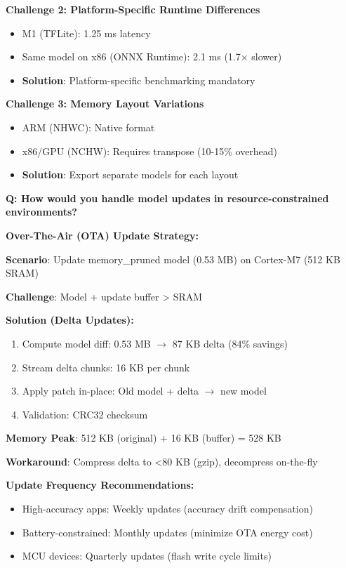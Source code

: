 \documentclass[10pt, a4paper]{article}
\begin{document}
\textbf{Challenge 2: Platform-Specific Runtime Differences}
\begin{itemize}
    \item M1 (TFLite): 1.25 ms latency
    \item Same model on x86 (ONNX Runtime): 2.1 ms (1.7× slower)
    \item \textbf{Solution}: Platform-specific benchmarking mandatory
\end{itemize}

\textbf{Challenge 3: Memory Layout Variations}
\begin{itemize}
    \item ARM (NHWC): Native format
    \item x86/GPU (NCHW): Requires transpose (10-15\% overhead)
    \item \textbf{Solution}: Export separate models for each layout
\end{itemize}

\textbf{Q: How would you handle model updates in resource-constrained environments?}

\textbf{Over-The-Air (OTA) Update Strategy:}

\textbf{Scenario}: Update memory\_pruned model (0.53 MB) on Cortex-M7 (512 KB SRAM)

\textbf{Challenge}: Model + update buffer > SRAM

\textbf{Solution (Delta Updates):}
\begin{enumerate}
    \item Compute model diff: 0.53 MB $\rightarrow$ 87 KB delta (84\% savings)
    \item Stream delta chunks: 16 KB per chunk
    \item Apply patch in-place: Old model + delta $\rightarrow$ new model
    \item Validation: CRC32 checksum
\end{enumerate}

\textbf{Memory Peak}: 512 KB (original) + 16 KB (buffer) = 528 KB

\textbf{Workaround}: Compress delta to <80 KB (gzip), decompress on-the-fly

\textbf{Update Frequency Recommendations:}
\begin{itemize}
    \item High-accuracy apps: Weekly updates (accuracy drift compensation)
    \item Battery-constrained: Monthly updates (minimize OTA energy cost)
    \item MCU devices: Quarterly updates (flash write cycle limits)
\end{itemize}
\end{document}
